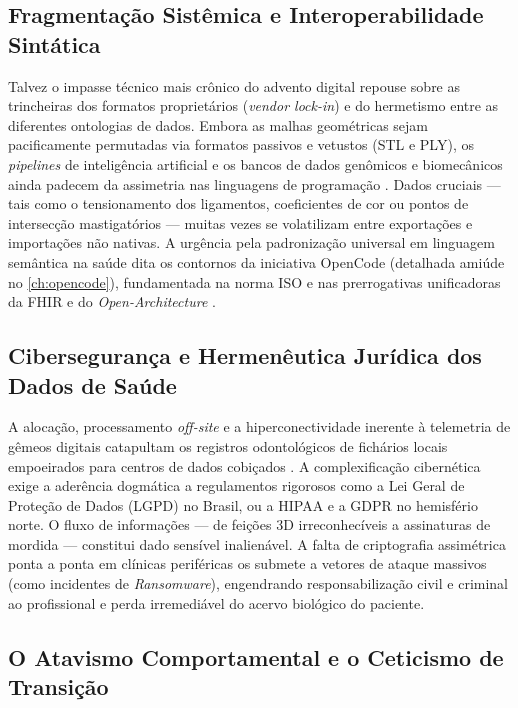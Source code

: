 \subsection*{Fragmentação Sistêmica e Interoperabilidade Sintática}

Talvez o impasse técnico mais crônico do advento digital repouse sobre as trincheiras dos formatos proprietários (\textit{vendor lock-in}) e do hermetismo entre as diferentes ontologias de dados. Embora as malhas geométricas sejam pacificamente permutadas via formatos passivos e vetustos (STL e PLY), os \textit{pipelines} de inteligência artificial e os bancos de dados genômicos e biomecânicos ainda padecem da assimetria nas linguagens de programação \cite{infante2024fmi}. Dados cruciais — tais como o tensionamento dos ligamentos, coeficientes de cor ou pontos de intersecção mastigatórios — muitas vezes se volatilizam entre exportações e importações não nativas. A urgência pela padronização universal em linguagem semântica na saúde dita os contornos da iniciativa OpenCode (detalhada amiúde no \autoref{ch:opencode}), fundamentada na norma ISO e nas prerrogativas unificadoras da FHIR e do \textit{Open-Architecture} \cite{infante2025distributed}.

\subsection*{Cibersegurança e Hermenêutica Jurídica dos Dados de Saúde}

A alocação, processamento \textit{off-site} e a hiperconectividade inerente à telemetria de gêmeos digitais catapultam os registros odontológicos de fichários locais empoeirados para centros de dados cobiçados \cite{robles2023opentwins}. A complexificação cibernética exige a aderência dogmática a regulamentos rigorosos como a Lei Geral de Proteção de Dados (LGPD) no Brasil, ou a HIPAA e a GDPR no hemisfério norte. O fluxo de informações — de feições 3D irreconhecíveis a assinaturas de mordida — constitui dado sensível inalienável. A falta de criptografia assimétrica ponta a ponta em clínicas periféricas os submete a vetores de ataque massivos (como incidentes de \textit{Ransomware}), engendrando responsabilização civil e criminal ao profissional e perda irremediável do acervo biológico do paciente.

\subsection*{O Atavismo Comportamental e o Ceticismo de Transição}

